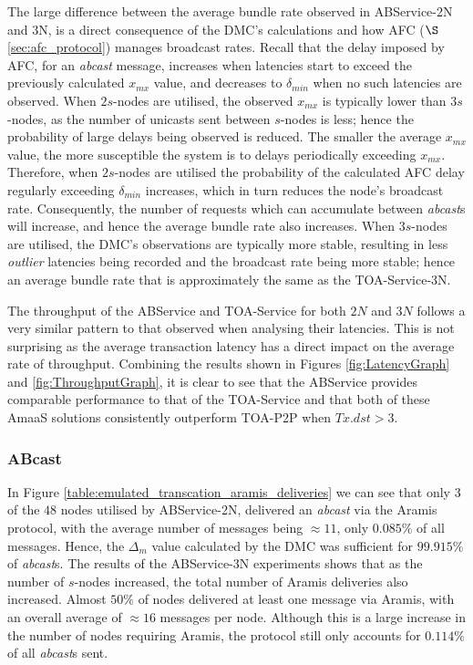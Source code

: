     The large difference between the average bundle rate observed in ABService-2N and 3N, is a direct consequence of the DMC's calculations and how AFC ($\S$ \ref{sec:afc_protocol}) manages broadcast rates.  Recall that the delay imposed by AFC, for an \emph{abcast} message, increases when latencies start to exceed the previously calculated $x_{mx}$ value, and decreases to $\delta_{min}$ when no such latencies are observed.  When $2 s$-nodes are utilised, the observed $x_{mx}$ is typically lower than $3 s$-nodes, as the number of unicasts sent between $s$-nodes is less; hence the probability of large delays being observed is reduced.  The smaller the average $x_{mx}$ value, the more susceptible the system is to delays periodically exceeding $x_{mx}$.  Therefore, when $2 s$-nodes are utilised the probability of the calculated AFC delay regularly exceeding $\delta_{min}$ increases, which in turn reduces the node's broadcast rate.  Consequently, the number of requests which can accumulate between \emph{abcast}s will increase, and hence the average bundle rate also increases.  When $3 s$-nodes are utilised, the DMC's observations are typically more stable, resulting in less \emph{outlier} latencies being recorded and the broadcast rate being more stable; hence an average bundle rate that is approximately the same as the TOA-Service-3N.  
	
	The throughput of the ABService and TOA-Service for both $2N$ and $3N$ follows a very similar pattern to that observed when analysing their latencies.  This is not surprising as the average transaction latency has a direct impact on the average rate of throughput.  Combining the results shown in Figures \ref{fig:LatencyGraph} and \ref{fig:ThroughputGraph}, it is clear to see that the ABService provides comparable performance to that of the TOA-Service and that both of these \textsf{AmaaS} solutions consistently outperform TOA-P2P when $Tx.dst > 3$.  
	
	\subsubsection*{ABcast}
	In Figure \ref{table:emulated_transcation_aramis_deliveries} we can see that only $3$ of the $48$ nodes utilised by ABService-2N, delivered an \emph{abcast} via the \textsf{Aramis} protocol, with the average number of messages being $\approx 11$, only $0.085\%$ of all messages.  Hence, the $\Delta_m$ value calculated by the DMC was sufficient for  $99.915\%$ of \emph{abcast}s.  The results of the ABService-3N experiments shows that as the number of $s$-nodes increased,  the total number of \textsf{Aramis} deliveries also increased.  Almost $50\%$ of nodes delivered at least one message via \textsf{Aramis}, with an overall average of $\approx 16$ messages per node.  Although this is a large increase in the number of nodes requiring \textsf{Aramis}, the protocol still only accounts for $0.114\%$ of all \emph{abcast}s sent.  
	
